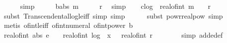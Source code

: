 \begin{isabellebody}
\ \ \ \ \isamarkupfalse%
\ simp\isanewline
\ \ \isamarkupfalse%
\ \isamarkupfalse%
\ b{\isacharcolon}{\kern0pt}{\isachardoublequoteopen}abs\ m\ {\isacharplus}{\kern0pt}\ {}\ {\isasymle}\ {}\ {\isacharcircum}{\kern0pt}\ {\isacharparenleft}{\kern0pt}r{\isacharplus}{\kern0pt}{}{\isacharparenright}{\kern0pt}{\isachardoublequoteclose}\ \isamarkupfalse%
\ simp\isanewline
\ \ \isamarkupfalse%
\ c{\isacharcolon}{\kern0pt}{\isachardoublequoteopen}log\ {}\ {\isacharparenleft}{\kern0pt}real{\isacharunderscore}{\kern0pt}of{\isacharunderscore}{\kern0pt}int\ {\isacharparenleft}{\kern0pt}{\isasymbar}m{\isasymbar}\ {\isacharplus}{\kern0pt}\ {}{\isacharparenright}{\kern0pt}{\isacharparenright}{\kern0pt}\ {\isasymle}\ r{\isacharplus}{\kern0pt}{}{\isachardoublequoteclose}\isanewline
\ \ \ \ \isamarkupfalse%
\ {\isacharparenleft}{\kern0pt}subst\ Transcendental{\isachardot}{\kern0pt}log{\isacharunderscore}{\kern0pt}le{\isacharunderscore}{\kern0pt}iff{\isacharcomma}{\kern0pt}\ simp{\isacharcomma}{\kern0pt}\ simp{\isacharparenright}{\kern0pt}\isanewline
\ \ \ \ \isamarkupfalse%
\ {\isacharparenleft}{\kern0pt}subst\ powr{\isacharunderscore}{\kern0pt}realpow{\isacharcomma}{\kern0pt}\ simp{\isacharparenright}{\kern0pt}\isanewline
\ \ \ \ \isamarkupfalse%
\ {\isacharparenleft}{\kern0pt}metis\ of{\isacharunderscore}{\kern0pt}int{\isacharunderscore}{\kern0pt}le{\isacharunderscore}{\kern0pt}iff\ of{\isacharunderscore}{\kern0pt}int{\isacharunderscore}{\kern0pt}numeral\ of{\isacharunderscore}{\kern0pt}int{\isacharunderscore}{\kern0pt}power\ b{\isacharparenright}{\kern0pt}\isanewline
\isanewline
\ \ \isamarkupfalse%
\ {\isachardoublequoteopen}real{\isacharunderscore}{\kern0pt}of{\isacharunderscore}{\kern0pt}int\ {\isacharparenleft}{\kern0pt}abs\ e\ {\isacharplus}{\kern0pt}\ {}{\isacharparenright}{\kern0pt}\ {\isasymle}\ real{\isacharunderscore}{\kern0pt}of{\isacharunderscore}{\kern0pt}int\ {\isasymbar}{\isasymlfloor}log\ {}\ {\isasymbar}x{\isasymbar}{\isasymrfloor}{\isasymbar}\ {\isacharplus}{\kern0pt}\ \ real{\isacharunderscore}{\kern0pt}of{\isacharunderscore}{\kern0pt}int\ r\ {\isacharplus}{\kern0pt}\ {}{\isachardoublequoteclose}\isanewline
\ \ \ \ \isamarkupfalse%
\ {\isacharparenleft}{\kern0pt}simp\ add{\isacharcolon}{\kern0pt}e{\isacharunderscore}{\kern0pt}def{\isacharparenright}{\kern0pt}\isanewline
\ \ \isamarkupfalse%

\end{isabellebody}
